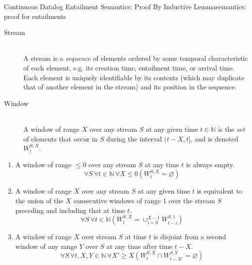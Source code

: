 \begin{nestedsection}{Continuous Datalog Entailment Semantics: Proof By Inductive Lemma}{semantics: proof for entailments}
	\begin{description}
		\item[Stream]\label{def:continuous datalog: stream}\hfill\\
			A stream is a \emph{sequence} of elements ordered by some temporal characteristic of each element, e.g. its creation time, entailment time, or arrival time.
			Each element is uniquely identifiable by its contents (which may duplicate that of another element in the stream) and its position in the sequence.
		\item[Window]\label{def:continuous datalog: window}\hfill\\
			A window of range $X$ over any stream $S$ at any given time ${t \in \mathbb{N}}$ is the \emph{set} of elements that occur in $S$ during the interval ${(t-X,t]}$, and is denoted ${W^{S,X}_{t}}$.
	\end{description}
	\begin{enumerate}
		\item\label{axiom:continuous datalog: window range leq 0}
			A window of range ${{\leq} 0}$ over any stream $S$ at any time $t$ is always empty.
			\begin{equation*}
				\forall S \, \forall t \in \mathbb{N} \, \forall X \leq 0 
					\left( W^{S,X}_{t} = \varnothing \right)
			\end{equation*}
		\item\label{axiom:continuous datalog: window composition}
			A window of range $X$ over any stream $S$ at any given time $t$ is equivalent to the union of the $X$ consecutive windows of range 1 over the stream $S$ preceding and including that at time $t$.
			\begin{equation*}
				\forall S \, \forall t \in \mathbb{N} 
					\left( W^{S,X}_t = \mathop{\cup}_{i=0}^{X-1} W^{S,1}_{t-i} \right)
			\end{equation*}
		\item\label{axiom:continuous datalog: window disjointness}
			A window of range $X$ over stream $S$ at time $t$ is disjoint from a second window of any range $Y$ over $S$ at any time after time ${t - X}$.
			\begin{equation*}
				\forall S \, \forall t,X,Y \in \mathbb{N} \, \forall X' \geq X 
					\left( W^{S,X}_t \cap W^{S,Y}_{t-X'} = \varnothing \right)
			\end{equation*}

\end{enumerate}
\end{nestedsection}
